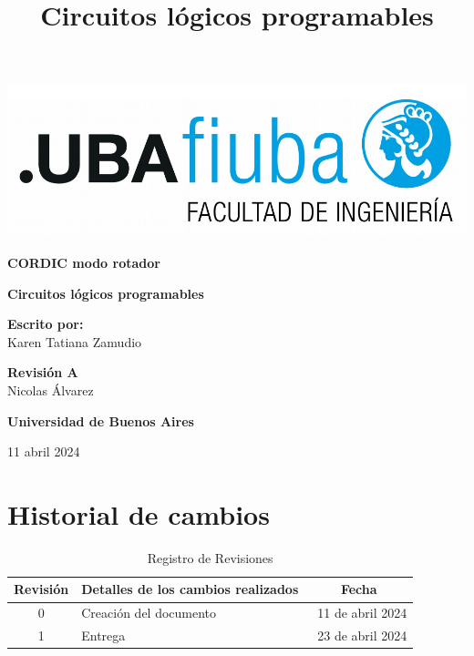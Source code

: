 \documentclass[12pt,a4paper, twoside]{article} %
\date{}
\title{Circuitos lógicos programables}
\begin{document}
\renewcommand\refname{}
\renewcommand{\contentsname}{Tabla de contenido}
\newpage

\begin{titlepage}
    \begin{center}
        \vspace*{1cm}

                \includegraphics[width=1\textwidth]{Figuras/logoFIUBA.pdf} %

        \vspace{1.5cm}

        \textbf{\LARGE CORDIC modo rotador}

        \vspace{4cm}
        \textbf{\Large Circuitos lógicos programables}

        \vspace{1.5cm}


        \textbf{\Large Escrito por:}\\
        \large Karen Tatiana Zamudio

        \vspace{0.8cm}

        \textbf{\Large Revisión A}\\
        \large Nicolas Álvarez

        \vfill

        \textbf{\Large Universidad de Buenos Aires}\\
        \vspace{0.2cm}

        \large  11 abril 2024

    \end{center}
\end{titlepage}
\newpage

\section*{Historial de cambios}
\label{sec:registro}

\begin{table}[ht]
  \centering
  \caption{Registro de Revisiones}
  \label{tab:registro}
  \begin{tabularx}{\linewidth}{|c|X|c|}
    \hline
    Revisión & Detalles de los cambios realizados & Fecha \\
    \hline
    0 & Creación del documento & \ 11 de abril 2024 \\
    \hline
    1 & Entrega  & \ 23 de abril 2024 \\
    \hline
  \end{tabularx}
\end{table}
\end{document}
